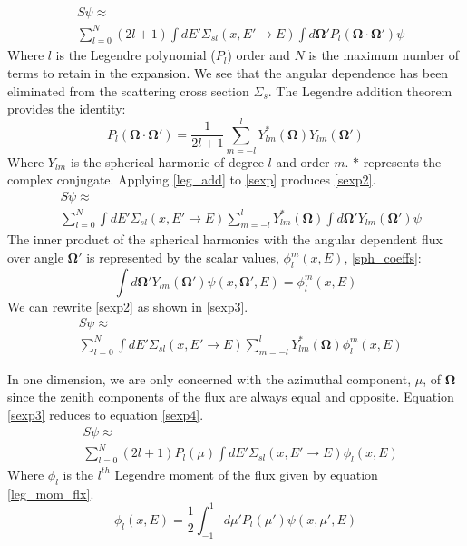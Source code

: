\begin{eqnarray}
& S\psi \approx \nonumber \\
& \sum_{l=0}^N (2l+1) \int dE' \Sigma_{sl}(x, E'\rightarrow E)
  \int d\mathbf\Omega' P_l(\mathbf\Omega \cdot \mathbf{\Omega'}) \psi
\label{sexp}
\end{eqnarray}
Where $l$ is the Legendre polynomial ($P_l$) order and $N$ is the maximum number of terms to retain in the expansion.  We see that the angular dependence has been eliminated from the scattering cross section $\Sigma_s$.
The Legendre addition theorem provides the identity:
\begin{equation}
P_l(\mathbf\Omega \cdot \mathbf{\Omega'}) = \frac{1}{2l+1}
\sum_{m=-l}^{l} Y^{*}_{lm}(\mathbf\Omega) Y_{lm}(\mathbf\Omega')
\label{leg_add}
\end{equation}
Where $Y_{lm}$ is the spherical harmonic of degree $l$ and order $m$.  $*$ represents the complex conjugate.  Applying \ref{leg_add} to \ref{sexp} produces \ref{sexp2}.
\begin{eqnarray}
& S\psi \approx \nonumber \\
& \sum_{l=0}^N \int dE' \Sigma_{sl}(x, E'\rightarrow E) \sum_{m=-l}^{l} Y^{*}_{lm}(\mathbf\Omega)
  \int d\mathbf\Omega' Y_{lm}(\mathbf\Omega') \psi
\label{sexp2}
\end{eqnarray}
The inner product of the spherical harmonics with the angular dependent flux over angle $\mathbf\Omega'$ is represented by the scalar values, $\phi_l^m(x, E)$, \ref{sph_coeffs}:
\begin{equation}
\int d\mathbf\Omega' Y_{lm}(\mathbf\Omega') \psi(x, \mathbf\Omega', E) = \phi_l^m(x, E)
\label{sph_coeffs}
\end{equation}
We can rewrite \ref{sexp2} as shown in \ref{sexp3}.
\begin{eqnarray}
& S\psi \approx \nonumber \\
& \sum_{l=0}^N \int dE' \Sigma_{sl}(x, E'\rightarrow E) \sum_{m=-l}^{l} Y^{*}_{lm}(\mathbf\Omega) \phi_l^m(x, E)
\label{sexp3}
\end{eqnarray}

In one dimension, we are only concerned with the azimuthal component, $\mu$, of $\mathbf\Omega$ since the zenith components of the flux are always equal and opposite.  Equation \ref{sexp3} reduces to equation \ref{sexp4}.
\begin{eqnarray}
& S\psi \approx \nonumber \\
& \sum_{l=0}^N (2l+1) P_l(\mu) \int dE' \Sigma_{sl}(x, E'\rightarrow E) \phi_l(x, E)
\label{sexp4}
\end{eqnarray}
Where $\phi_l$ is the $l^{th}$ Legendre moment of the flux given by equation \ref{leg_mom_flx}.
\begin{equation}
\phi_l(x,E) = \frac{1}{2} \int_{-1}^1 d\mu' P_l(\mu') \psi(x, \mu', E)
\label{leg_mom_flx}
\end{equation}

